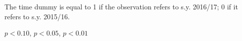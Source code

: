 \begin{table}[htbp]
\begin{adjustbox}{width=1\textwidth}
\begin{threeparttable}
\begin{tablenotes}
\item The time dummy is equal to 1 if the observation refers to s.y. 2016/17; 0 if it refers to s.y. 2015/16. \\
\item \sym{*} \(p<0.10\), \sym{**} \(p<0.05\), \sym{***} \(p<0.01\)
\end{tablenotes}
\end{threeparttable}
\end{adjustbox}
\label{tab:stability}
\end{table}
